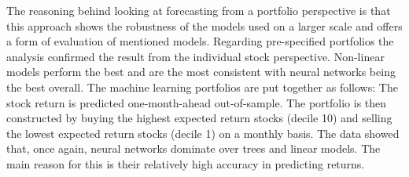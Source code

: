 The reasoning behind looking at forecasting from a portfolio perspective is that this approach shows the robustness of the models used on a larger scale and offers a form of evaluation of mentioned models.
Regarding pre-specified portfolios the analysis confirmed the result from the individual stock perspective. Non-linear models perform the best and are the most consistent with neural networks being the best overall.
The machine learning portfolios are put together as follows: The stock return is predicted one-month-ahead out-of-sample. The portfolio is then constructed by buying the highest expected return stocks (decile 10) and selling the lowest expected return stocks (decile 1) on a monthly basis.
The data showed that, once again, neural networks dominate over trees and linear models. The main reason for this is their relatively high accuracy in predicting returns.
